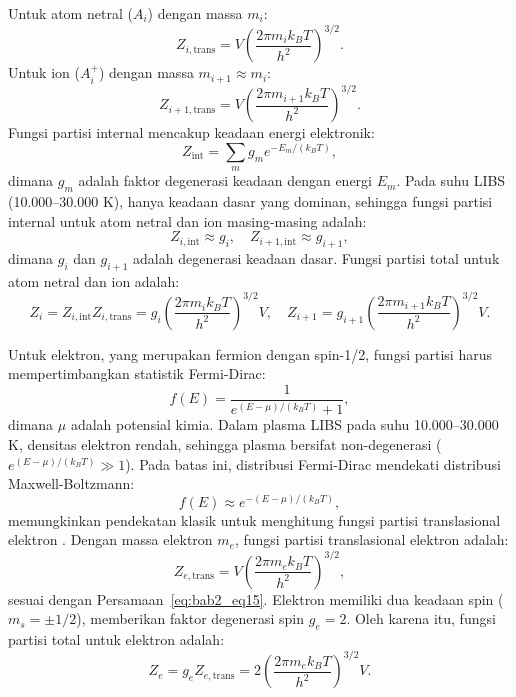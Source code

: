 Untuk atom netral (\( A_i \)) dengan massa \( m_i \):
\begin{equation}
Z_{i,\text{trans}} = V \left( \frac{2\pi m_i k_B T}{h^2} \right)^{3/2}. \label{eq:bab2_eq16}
\end{equation}
Untuk ion (\( A_i^+ \)) dengan massa \( m_{i+1} \approx m_i \):
\begin{equation}
Z_{i+1,\text{trans}} = V \left( \frac{2\pi m_{i+1} k_B T}{h^2} \right)^{3/2}. \label{eq:bab2_eq17}
\end{equation}
Fungsi partisi internal mencakup keadaan energi elektronik:
\begin{equation}
Z_{\text{int}} = \sum_m g_m e^{-E_m/(k_B T)}, \label{eq:bab2_eq18}
\end{equation}
dimana \( g_m \) adalah faktor degenerasi keadaan dengan energi \( E_m \). Pada suhu LIBS (10.000–30.000 K), hanya keadaan dasar yang dominan, sehingga fungsi partisi internal untuk atom netral dan ion masing-masing adalah:
\[
Z_{i,\text{int}} \approx g_i, \quad Z_{i+1,\text{int}} \approx g_{i+1},
\]
dimana \( g_i \) dan \( g_{i+1} \) adalah degenerasi keadaan dasar. Fungsi partisi total untuk atom netral dan ion adalah:
\begin{equation}
Z_i = Z_{i,\text{int}} Z_{i,\text{trans}} = g_i \left( \frac{2\pi m_i k_B T}{h^2} \right)^{3/2} V, \quad Z_{i+1} = g_{i+1} \left( \frac{2\pi m_{i+1} k_B T}{h^2} \right)^{3/2} V. \label{eq:bab2_eq19}
\end{equation}

Untuk elektron, yang merupakan fermion dengan spin-1/2, fungsi partisi harus mempertimbangkan statistik Fermi-Dirac:
\begin{equation}
f(E) = \frac{1}{e^{(E - \mu)/(k_B T)} + 1}, \label{eq:bab2_eq20}
\end{equation}
dimana \( \mu \) adalah potensial kimia. Dalam plasma LIBS pada suhu 10.000–30.000 K, densitas elektron rendah, sehingga plasma bersifat non-degenerasi (\( e^{(E - \mu)/(k_B T)} \gg 1 \)). Pada batas ini, distribusi Fermi-Dirac mendekati distribusi Maxwell-Boltzmann:
\begin{equation}
f(E) \approx e^{-(E - \mu)/(k_B T)}, \label{eq:bab2_eq21}
\end{equation}
memungkinkan pendekatan klasik untuk menghitung fungsi partisi translasional elektron \citep{Pathria2011}. Dengan massa elektron \( m_e \), fungsi partisi translasional elektron adalah:
\begin{equation}
Z_{e,\text{trans}} = V \left( \frac{2\pi m_e k_B T}{h^2} \right)^{3/2}, \label{eq:bab2_eq22}
\end{equation}
sesuai dengan Persamaan~\eqref{eq:bab2_eq15}. Elektron memiliki dua keadaan spin (\( m_s = \pm 1/2 \)), memberikan faktor degenerasi spin \( g_e = 2 \). Oleh karena itu, fungsi partisi total untuk elektron adalah:
\begin{equation}
Z_e = g_e Z_{e,\text{trans}} = 2 \left( \frac{2\pi m_e k_B T}{h^2} \right)^{3/2} V. \label{eq:bab2_eq23}
\end{equation}

